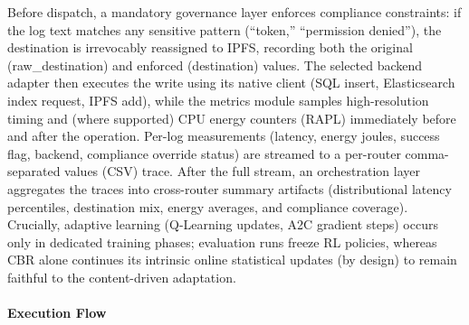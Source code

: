 Before dispatch, a mandatory governance layer enforces compliance constraints: if the log text matches any sensitive pattern (“token,” “permission denied”), the destination is irrevocably reassigned to IPFS, recording both the original (raw\_destination) and enforced (destination) values. The selected backend adapter then executes the write using its native client (SQL insert, Elasticsearch index request, IPFS add), while the metrics module samples high-resolution timing and (where supported) CPU energy counters (RAPL) immediately before and after the operation. Per-log measurements (latency, energy joules, success flag, backend, compliance override status) are streamed to a per-router comma-separated values (CSV) trace. After the full stream, an orchestration layer aggregates the traces into cross-router summary artifacts (distributional latency percentiles, destination mix, energy averages, and compliance coverage). Crucially, adaptive learning (Q-Learning updates, A2C gradient steps) occurs only in dedicated training phases; evaluation runs freeze RL policies, whereas CBR alone continues its intrinsic online statistical updates (by design) to remain faithful to the content-driven adaptation.

\paragraph{Execution Flow}


